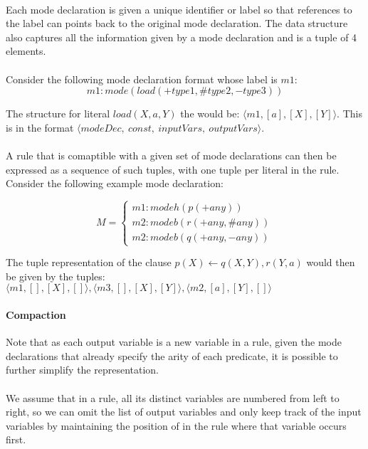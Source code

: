 \documentclass{article}
\theoremstyle{plain}
\theoremstyle{definition}
\begin{document}
\begin{multicols}{2}
\paragraph{} Each mode declaration is given a unique identifier or label so that references to the label can points back to the original mode declaration. The data structure also captures all the information given by a mode declaration and is a tuple of 4 elements.

\paragraph{} Consider the following mode declaration format whose label is $m1$: $$m1: mode(load(+type1, \#type2, -type3))$$

\noindent The structure for literal $load(X, a, Y)$ the would be: $\langle m1, [a], [X], [Y]\rangle$. This is in the format $\langle modeDec,\ const,\ inputVars,\ outputVars \rangle$.

\paragraph{} A rule that is comaptible with a given set of mode declarations can then be expressed as a sequence of such tuples, with one tuple per literal in the rule. Consider the following example mode declaration:

\[
M = \begin{cases}
m1: modeh(p(+any))\\
m2: modeb(r(+any, \#any))\\
m2: modeb(q(+any, -any))
\end{cases}
\]

\noindent The tuple representation of the clause $p(X) \leftarrow q(X, Y), r(Y, a)$ would then be given by the tuples: $\langle m1, [], [X], []\rangle, \langle m3, [], [X], [Y] \rangle, \langle m2, [a], [Y], [] \rangle$

\paragraph{Compaction} Note that as each output variable is a new variable in a rule, given the mode declarations that already specify the arity of each predicate, it is possible to further simplify the representation. 

\paragraph{} We assume that in a rule, all its distinct variables are numbered from left to right, so we can omit the list of output variables and only keep track of the input variables by maintaining the position of in the rule where that variable occurs first.


\end{multicols}
\end{document}
